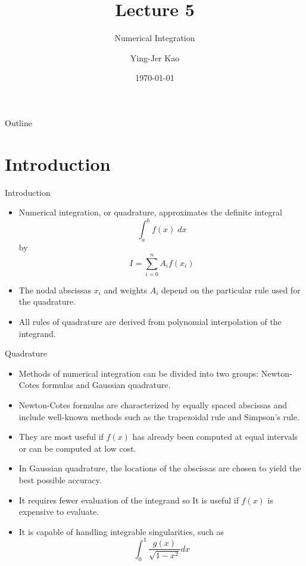 \documentclass{beamer}
\title[Numerical Integration] %
{Lecture 5}
\subtitle
{Numerical Integration} %
\author[Ying-Jer Kao] %
{Ying-Jer Kao}
\institute[National Taiwan University] %
{
  Department of Physics\\
 National Taiwan University
  }
\date[Numerical Analysis and Programming] %
{\today}
\begin{document}
\begin{frame}
  \titlepage
\end{frame}

\begin{frame}{Outline}
  \tableofcontents
\end{frame}



\section[Introduction]{Introduction}
\begin{frame}{Introduction}
\begin{itemize}
\item Numerical integration, or \alert{quadrature}, approximates the definite integral 
\[
\int_a^b f(x)\; dx
\]
by 
\[
I=\sum_{i=0}^n A_i f(x_i)
\]
\item The \alert{nodal abscissas} $x_i$ and \alert{weights} $A_i$ depend on the particular rule used for the quadrature.
\item All rules of quadrature are derived from \alert{ polynomial interpolation} of the integrand.
\end{itemize}
\end{frame}

\begin{frame}{Quadrature}
\begin{itemize}
\item Methods of numerical integration can be divided into two groups: Newton-Cotes formulas and Gaussian quadrature. 
\item Newton-Cotes formulas are characterized by \alert{equally spaced abscissas} and include well-known methods such as the trapezoidal rule and Simpson's rule. 
\item They are most useful if $f(x)$ has already been computed at equal intervals or can be computed at low cost.
\item In Gaussian quadrature, the locations of the abscissas are chosen to yield the \alert{best possible accuracy}.
\item  It requires fewer evaluation of the integrand so It is useful if $f(x)$ is expensive to evaluate. 
\item It is capable of handling \alert{integrable singularities}, such as
\[
\int_0^1 \frac{g(x)}{\sqrt{1-x^2}} dx
\]
\end{itemize}
\end{frame}
\end{document}
